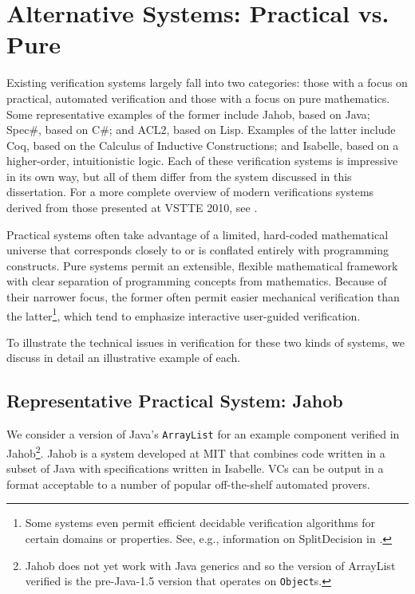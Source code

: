 \section{Alternative Systems: Practical vs. Pure}
Existing verification systems largely fall into two categories: those with a focus on practical, automated verification and those with a focus on pure mathematics.  Some representative examples of the former include Jahob\cite{kuncakJahobOverview}, based on Java; Spec\#\cite{specsharp}, based on C\#; and ACL2\cite{kaufmannACL2}, based on Lisp.  Examples of the latter include Coq\cite{coq}, based on the Calculus of Inductive Constructions; and Isabelle\cite{nipkowIsabelle}, based on a higher-order, intuitionistic logic.  Each of these verification systems is impressive in its own way, but all of them differ from the system discussed in this dissertation.  For a more complete overview of modern verifications systems derived from those presented at VSTTE 2010, see \cite{klebanovVSTTEExperience}.

Practical systems often take advantage of a limited, hard-coded mathematical universe that corresponds closely to or is conflated entirely with programming constructs.  Pure systems permit an extensible, flexible mathematical framework with clear separation of programming concepts from mathematics.  Because of their narrower focus, the former often permit easier mechanical verification than the latter\footnote{Some systems even permit efficient decidable verification algorithms for certain domains or properties.  See, e.g., information on SplitDecision in \cite{Sit11}.}, which tend to emphasize interactive user-guided verification.

To illustrate the technical issues in verification for these two kinds of systems, we discuss in detail an illustrative example of each.

\subsection{Representative Practical System: Jahob\label{sec:exPractical}}
We consider a version of Java's \texttt{ArrayList} for an example component verified in Jahob\footnote{Jahob does not yet work with Java generics and so the version of ArrayList verified is the pre-Java-1.5 version that operates on \texttt{Object}s.}.  Jahob is a system developed at MIT that combines code written in a subset of Java with specifications written in Isabelle.  VCs can be output in a format acceptable to a number of popular off-the-shelf automated provers.

